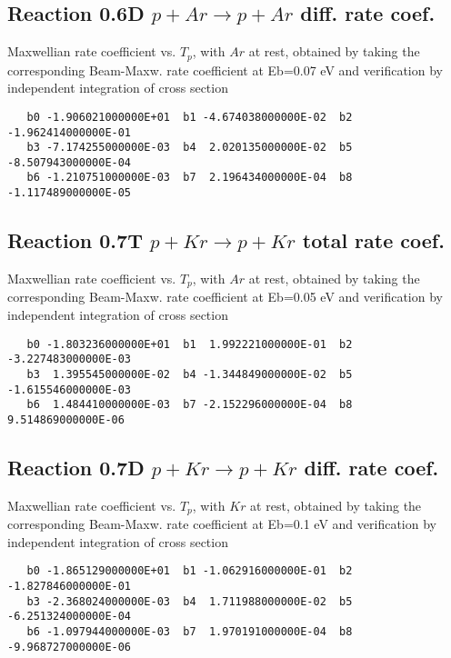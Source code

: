 \documentclass[12pt,dvipdfmx]{article}
\begin{document}
\subsection{
Reaction 0.6D  $p + Ar \rightarrow p + Ar$ diff. rate coef.
}
Maxwellian rate coefficient vs. $T_{p}$, with $Ar$ at rest, obtained by taking
the corresponding Beam-Maxw. rate coefficient at Eb=0.07 eV and
verification by independent integration of cross section
\begin{small}\begin{verbatim}
   b0 -1.906021000000E+01  b1 -4.674038000000E-02  b2 -1.962414000000E-01
   b3 -7.174255000000E-03  b4  2.020135000000E-02  b5 -8.507943000000E-04
   b6 -1.210751000000E-03  b7  2.196434000000E-04  b8 -1.117489000000E-05
\end{verbatim}\end{small}




\subsection{
Reaction 0.7T  $p + Kr \rightarrow p + Kr$ total rate coef.
}
Maxwellian rate coefficient vs. $T_{p}$, with $Ar$ at rest, obtained by taking
the corresponding Beam-Maxw. rate coefficient at Eb=0.05 eV and
verification by independent integration of cross section
\begin{small}\begin{verbatim}
   b0 -1.803236000000E+01  b1  1.992221000000E-01  b2 -3.227483000000E-03
   b3  1.395545000000E-02  b4 -1.344849000000E-02  b5 -1.615546000000E-03
   b6  1.484410000000E-03  b7 -2.152296000000E-04  b8  9.514869000000E-06
\end{verbatim}\end{small}


\subsection{
Reaction 0.7D  $p + Kr \rightarrow p + Kr$ diff. rate coef.
}
Maxwellian rate coefficient vs. $T_{p}$, with $Kr$ at rest, obtained by taking
the corresponding Beam-Maxw. rate coefficient at Eb=0.1 eV and
verification by independent integration of cross section
\begin{small}\begin{verbatim}
   b0 -1.865129000000E+01  b1 -1.062916000000E-01  b2 -1.827846000000E-01
   b3 -2.368024000000E-03  b4  1.711988000000E-02  b5 -6.251324000000E-04
   b6 -1.097944000000E-03  b7  1.970191000000E-04  b8 -9.968727000000E-06
\end{verbatim}\end{small}
\end{document}
